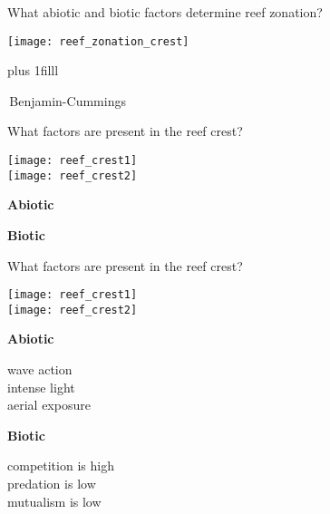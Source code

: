 \documentclass[t,handout]{beamer}  %
\begin{document}
\begin{frame}[t]{What abiotic and biotic factors determine reef zonation?}

\texttt{[image: reef\_zonation\_crest]}

\vskip0pt plus 1filll

\tiny\textcopyright\,Benjamin-Cummings
\end{frame}

\begin{frame}[t]{What factors are present in the reef crest?}

\begin{multicols}{2}
	\begin{center}
	
	\texttt{[image: reef\_crest1]}\\[1ex]
	
	\texttt{[image: reef\_crest2]}
	\end{center}
\columnbreak

	\hangpara\textbf{Abiotic}
	
	\vspace*{4\baselineskip}
	
	\hangpara\textbf{Biotic}
	
	
\end{multicols}
\end{frame}

\begin{frame}[t]{What factors are present in the reef crest?}

\begin{multicols}{2}
	\begin{center}
	
	\texttt{[image: reef\_crest1]}\\[1ex]
	
	\texttt{[image: reef\_crest2]}
	\end{center}
\columnbreak

	\hangpara\textbf{Abiotic}
	
	\hangpara wave action\\\pause intense light\\\pause aerial exposure
	
	\hangpara\textbf{Biotic}
	
	\hangpara competition is high\\\pause predation is low\\\pause mutualism is low
	
\end{multicols}
\end{frame}
\end{document}
